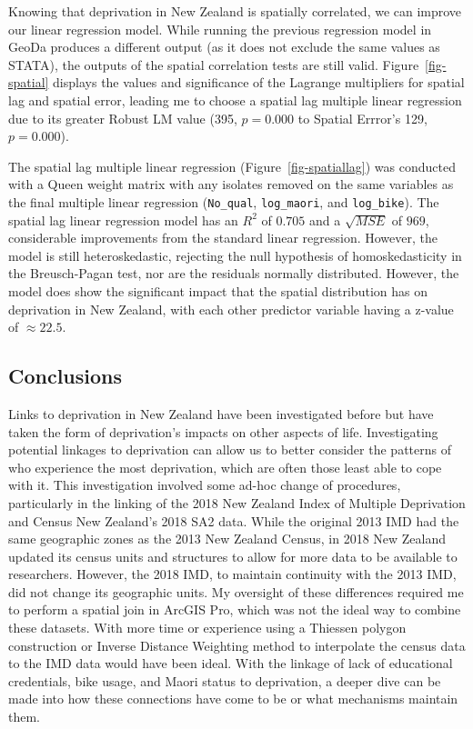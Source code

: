 \documentclass[
  letterpaper,
  DIV=11,
  numbers=noendperiod,
  oneside]{scrartcl}
\begin{document}
Knowing that deprivation in New Zealand is spatially correlated, we can
improve our linear regression model. While running the previous
regression model in GeoDa produces a different output (as it does not
exclude the same values as STATA), the outputs of the spatial
correlation tests are still valid. Figure~\ref{fig-spatial} displays the
values and significance of the Lagrange multipliers for spatial lag and
spatial error, leading me to choose a spatial lag multiple linear
regression due to its greater Robust LM value (395, \(p=0.000\) to
Spatial Errror's 129, \(p=0.000\)).

The spatial lag multiple linear regression (Figure~\ref{fig-spatiallag})
was conducted with a Queen weight matrix with any isolates removed on
the same variables as the final multiple linear regression
(\texttt{No\_qual}, \texttt{log\_maori}, and \texttt{log\_bike}). The
spatial lag linear regression model has an \(R^2\) of \(0.705\) and a
\(\sqrt{MSE}\) of \(969\), considerable improvements from the standard
linear regression. However, the model is still heteroskedastic,
rejecting the null hypothesis of homoskedasticity in the Breusch-Pagan
test, nor are the residuals normally distributed. However, the model
does show the significant impact that the spatial distribution has on
deprivation in New Zealand, with each other predictor variable having a
z-value of \(\approx 22.5\).

\hypertarget{conclusions}{%
\subsection{Conclusions}\label{conclusions}}

Links to deprivation in New Zealand have been investigated before but
have taken the form of deprivation's impacts on other aspects of life.
Investigating potential linkages to deprivation can allow us to better
consider the patterns of who experience the most deprivation, which are
often those least able to cope with it. This investigation involved some
ad-hoc change of procedures, particularly in the linking of the 2018 New
Zealand Index of Multiple Deprivation and Census New Zealand's 2018 SA2
data. While the original 2013 IMD had the same geographic zones as the
2013 New Zealand Census, in 2018 New Zealand updated its census units
and structures to allow for more data to be available to researchers.
However, the 2018 IMD, to maintain continuity with the 2013 IMD, did not
change its geographic units. My oversight of these differences required
me to perform a spatial join in ArcGIS Pro, which was not the ideal way
to combine these datasets. With more time or experience using a Thiessen
polygon construction or Inverse Distance Weighting method to interpolate
the census data to the IMD data would have been ideal. With the linkage
of lack of educational credentials, bike usage, and Maori status to
deprivation, a deeper dive can be made into how these connections have
come to be or what mechanisms maintain them.
\end{document}
